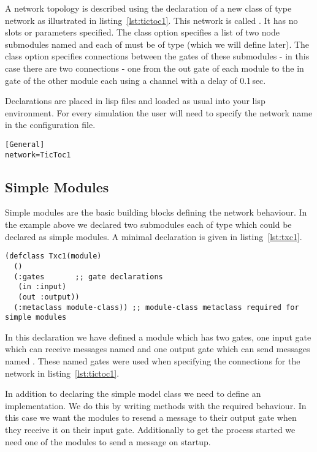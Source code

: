 \documentclass[a4paper,11pt,twoside,openany]{report}
\begin{document}
A network topology is described using the declaration of a new class
of type network as illustrated in listing~\ref{lst:tictoc1}. This
network is called . It has no slots or parameters
specified. The  class option specifies a list of two
node submodules named  and  each of must be of type
 (which we will define later). The  class
option specifies connections between the gates of these submodules - in this case
there are two connections - one from the out gate of each module to
the in gate of the other module each using a channel with a delay of
0.1\,sec.

Declarations are placed in lisp files and loaded as usual
into your lisp environment. For every simulation the user will need to
specify the network name in the configuration
file.

\begin{lstlisting}[style=ini]
[General]
network=TicToc1
\end{lstlisting}

\subsection{Simple Modules}
Simple modules are the basic building blocks defining the network
behaviour. In the example above we declared two submodules each of
type  which could be declared as simple modules. A minimal
declaration is given in listing~\ref{lst:txc1}.

\begin{lstlisting}[caption={A simple module},label={lst:txc1}]
(defclass Txc1(module)
  ()
  (:gates       ;; gate declarations
   (in :input)
   (out :output))
  (:metaclass module-class)) ;; module-class metaclass required for simple modules
\end{lstlisting}

In this declaration we have defined a module which has two gates, one
input gate which can receive messages named  and one output
gate which can send messages named . These named gates were
used when specifying the connections for the  network in
listing~\ref{lst:tictoc1}.

In addition to declaring the simple model class we need to define an
implementation. We do this by writing methods with the required
behaviour. In this case we want the modules to resend a message to
their output gate when they receive it on their input
gate. Additionally to get the process started we need one of the
modules to send a message on startup.
\end{document}
